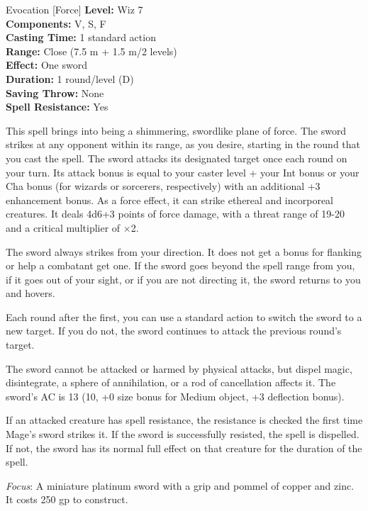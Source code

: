 {Evocation [Force]}
{
	\textbf{Level:}
	Wiz 7\\
	\textbf{Components:}
	V, S, F\\
	\textbf{Casting Time:}
	1 standard action\\
	\textbf{Range:}
	Close (7.5 m + 1.5 m/2 levels)\\
	\textbf{Effect:}
	One sword\\
	\textbf{Duration:}
	1 round/level (D)\\
	\textbf{Saving Throw:}
	None\\
	\textbf{Spell Resistance:}
	Yes\\
}
{
	This spell brings into being a shimmering, swordlike plane of force. The sword strikes at any opponent within its range, as you desire, starting in the round that you cast the spell. The sword attacks its designated target once each round on your turn. Its attack bonus is equal to your caster level + your Int bonus or your Cha bonus (for wizards or sorcerers, respectively) with an additional +3 enhancement bonus. As a force effect, it can strike ethereal and incorporeal creatures. It deals 4d6+3 points of force damage, with a threat range of 19-20 and a critical multiplier of $\times$2.

	The sword always strikes from your direction. It does not get a bonus for flanking or help a combatant get one. If the sword goes beyond the spell range from you, if it goes out of your sight, or if you are not directing it, the sword returns to you and hovers.

	Each round after the first, you can use a standard action to switch the sword to a new target. If you do not, the sword continues to attack the previous round's target.

	The sword cannot be attacked or harmed by physical attacks, but dispel magic, disintegrate, a sphere of annihilation, or a rod of cancellation affects it. The sword's AC is 13 (10, +0 size bonus for Medium object, +3 deflection bonus).

	If an attacked creature has spell resistance, the resistance is checked the first time Mage's sword strikes it. If the sword is successfully resisted, the spell is dispelled. If not, the sword has its normal full effect on that creature for the duration of the spell.

	\textit{Focus}:
	A miniature platinum sword with a grip and pommel of copper and zinc. It costs 250 gp to construct.

}
